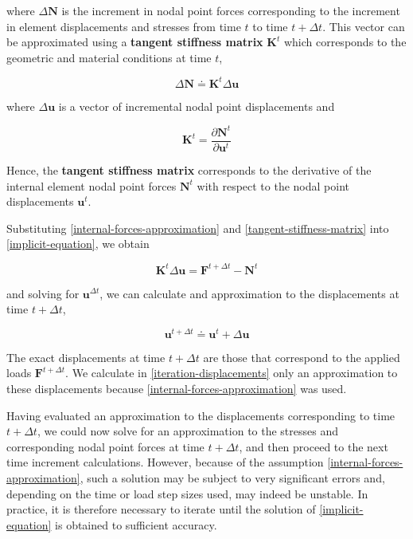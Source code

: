 \documentclass[10pt,b5paper,titlepage]{book}
\newcommand{\m}{\mathbf}
\begin{document}
where $ \Delta \m{N} $ is the increment in nodal point forces corresponding
to the increment in element displacements and stresses from time $ t $ to time
$ t + \Delta t $. This vector can be approximated using a \textbf{tangent stiffness matrix}
$ \m{K}^t $ which corresponds to the geometric and material conditions
at time $ t $,

\begin{equation}\label{internal-forces-approximation}
    \Delta \m{N} \doteq \m{K}^{t} \Delta \m{u}
\end{equation}

where $ \Delta \m{u} $ is a vector of incremental nodal point displacements and

\begin{equation}\label{tangent-stiffness-matrix}
    \m{K}^{t} = \frac{\partial \m{N}^{t}}{\partial \m{u}^{t}}
\end{equation}

Hence, the \textbf{tangent stiffness matrix} corresponds to the derivative of the
internal element nodal point forces $ \m{N}^{t} $ with respect to the
nodal point displacements $ \m{u}^{t} $.

Substituting \eqref{internal-forces-approximation} and
\eqref{tangent-stiffness-matrix} into \eqref{implicit-equation}, we obtain

\begin{equation}\label{iteration-equation}
    \m{K}^{t} \Delta \m{u} = \m{F}^{t + \Delta t} - \m{N}^{t}
\end{equation}

and solving for $ \m{u}^{\Delta t} $, we can calculate and approximation
to the displacements at time $ t + \Delta t $,

\begin{equation}\label{iteration-displacements}
    \m{u}^{t + \Delta t} \doteq \m{u}^{t} + \Delta \m{u}
\end{equation}

The exact displacements at time $ t + \Delta t $ are those that correspond to the
applied loads $ \m{F}^{t + \Delta t} $. We calculate in \eqref{iteration-displacements}
only an approximation to these displacements because \eqref{internal-forces-approximation}
was used.

Having evaluated an approximation to the displacements corresponding to
time $ t + \Delta t $, we could now solve for an approximation to the stresses and
corresponding nodal point forces at time $ t + \Delta t $, and then proceed to the
next time increment calculations. However, because of the assumption
\eqref{internal-forces-approximation}, such a solution may be subject to
very significant errors and, depending on the time or load step sizes used, may
indeed be unstable. In practice, it is therefore necessary to iterate until the
solution of \eqref{implicit-equation} is obtained to sufficient accuracy.
\end{document}
